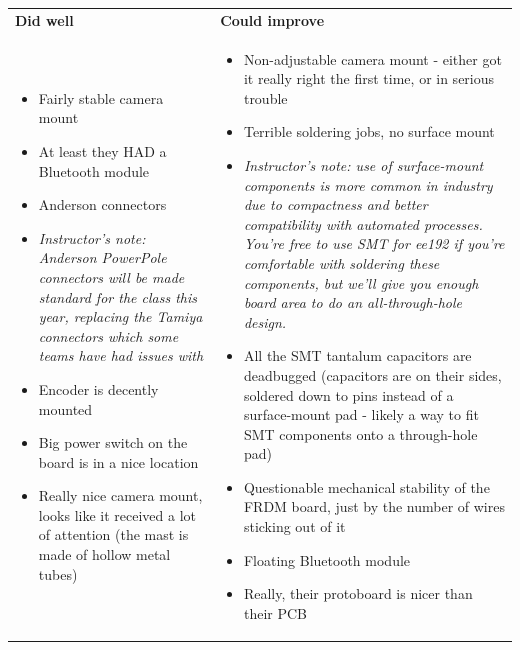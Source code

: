 \documentclass{article}
\begin{document}
\begin{tabularx}{\textwidth}{X X}
\textbf{Did well} & \textbf{Could improve} \\
\begin{itemize}
  \item Fairly stable camera mount
  \item At least they HAD a Bluetooth module
  \item Anderson connectors
  \item \textit{Instructor's note: Anderson PowerPole connectors will be made standard for the class this year, replacing the Tamiya connectors which some teams have had issues with}
  \item Encoder is decently mounted
  \item Big power switch on the board is in a nice location
  \item Really nice camera mount, looks like it received a lot of attention (the mast is made of hollow metal tubes)
\end{itemize}
&
\begin{itemize}
  \item Non-adjustable camera mount - either got it really right the first time, or in serious trouble
  \item Terrible soldering jobs, no surface mount
  \item \textit{Instructor's note: use of surface-mount components is more common in industry due to compactness and better compatibility with automated processes. You're free to use SMT for ee192 if you're comfortable with soldering these components, but we'll give you enough board area to do an all-through-hole design.}
  \item All the SMT tantalum capacitors are deadbugged (capacitors are on their sides, soldered down to pins instead of a surface-mount pad - likely a way to fit SMT components onto a through-hole pad)
  \item Questionable mechanical stability of the FRDM board, just by the number of wires sticking out of it
  \item Floating Bluetooth module
  \item Really, their protoboard is nicer than their PCB
\end{itemize}
\end{tabularx}
\end{document}
